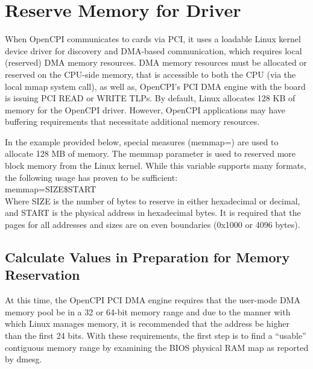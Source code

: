 \section{Reserve Memory for Driver}
\begin{flushleft}

When OpenCPI communicates to cards via PCI, it uses a loadable Linux kernel device driver
for discovery and DMA-based communication, which requires local (reserved) DMA memory
resources. DMA memory resources must be allocated or reserved on the CPU-side memory,
that is accessible to both the CPU (via the local mmap system call), as well as,
OpenCPI's PCI DMA engine with the board is issuing PCI READ or WRITE TLPs. By default,
Linux allocates 128 KB of memory for the OpenCPI driver. However, OpenCPI applications may have buffering requirements that necessitate additional memory resources. \\ \medskip

In the example provided below, special measures (memmap=) are used to allocate 128 MB of memory. The memmap parameter is used to reserved more block memory from the Linux kernel. While this variable supports many formats, the following usage has proven to be sufficient: \\ \bigskip
	memmap=SIZE\$START \\ \bigskip
Where SIZE is the number of bytes to reserve in either hexadecimal or decimal, and
START is the physical address in hexadecimal bytes. It is required that the pages for all addresses and sizes are on even boundaries (0x1000 or 4096 bytes). \\

\subsection{Calculate Values in Preparation for Memory Reservation}
At this time, the OpenCPI PCI DMA engine requires that the user-mode DMA memory pool be in a 32 or 64-bit memory range and due to the manner with which Linux manages memory, it is recommended that the address be higher than the first 24 bits. With these requirements, the first step is to find a “usable” contiguous memory range by examining the BIOS physical RAM map as reported by dmesg.\\ \medskip


\end{flushleft}
